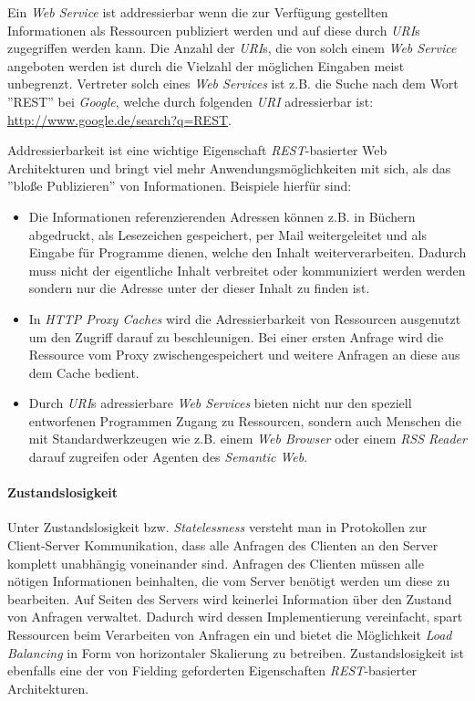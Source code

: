 Ein \textit{Web Service} ist addressierbar wenn die zur Verfügung
gestellten Informationen als Ressourcen publiziert werden und auf
diese durch \textit{URI}s zugegriffen werden kann. Die Anzahl der
\textit{URI}s, die von solch einem \textit{Web Service} angeboten
werden ist durch die Vielzahl der möglichen Eingaben meist unbegrenzt.
Vertreter solch eines \textit{Web Services} ist z.B. die Suche nach
dem Wort ''REST'' bei \textit{Google}, welche durch folgenden
\textit{URI} adressierbar ist:
\url{http://www.google.de/search?q=REST}.

Addressierbarkeit ist eine wichtige Eigenschaft
\textit{REST}-basierter Web Architekturen und bringt viel mehr
Anwendungsmöglichkeiten mit sich, als das ''bloße Publizieren'' von
Informationen. Beispiele hierfür sind:

\begin{itemize}
\item Die Informationen referenzierenden Adressen können z.B. in
  Büchern abgedruckt, als Lesezeichen gespeichert, per Mail
  weitergeleitet und als Eingabe für Programme dienen, welche den
  Inhalt weiterverarbeiten. Dadurch muss nicht der eigentliche Inhalt
  verbreitet oder kommuniziert werden werden sondern nur die Adresse
  unter der dieser Inhalt zu finden ist.
\item In \textit{HTTP Proxy Caches} wird die Adressierbarkeit von
  Ressourcen ausgenutzt um den Zugriff darauf zu beschleunigen. Bei
  einer ersten Anfrage wird die Ressource vom Proxy
  zwischengespeichert und weitere Anfragen an diese aus dem Cache
  bedient.
\item Durch \textit{URI}s adressierbare \textit{Web Services} bieten
  nicht nur den speziell entworfenen Programmen Zugang zu Ressourcen,
  sondern auch Menschen die mit Standardwerkzeugen wie z.B. einem
  \textit{Web Browser} oder einem \textit{RSS Reader} darauf zugreifen
  oder Agenten des \textit{Semantic Web}.
\end{itemize}

\paragraph{Zustandslosigkeit}

Unter Zustandslosigkeit bzw. \textit{Statelessness} versteht man in
Protokollen zur Client-Server Kommunikation, dass alle Anfragen des
Clienten an den Server komplett unabhängig voneinander sind. Anfragen
des Clienten müssen alle nötigen Informationen beinhalten, die vom
Server benötigt werden um diese zu bearbeiten. Auf Seiten des Servers
wird keinerlei Information über den Zustand von Anfragen
verwaltet. Dadurch wird dessen Implementierung vereinfacht, spart
Ressourcen beim Verarbeiten von Anfragen ein und bietet die
Möglichkeit \textit{Load Balancing} in Form von horizontaler
Skalierung zu betreiben. Zustandslosigkeit ist ebenfalls eine der von
Fielding geforderten Eigenschaften \textit{REST}-basierter
Architekturen.

